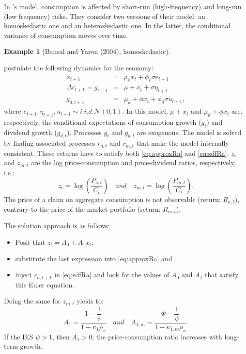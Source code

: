 \documentclass[
  12pt,
]{book}
\providecommand{\tightlist}{%
  \setlength{\itemsep}{0pt}\setlength{\parskip}{0pt}}
\theoremstyle{definition}
\theoremstyle{definition}
\newtheorem{example}{Example}[chapter]
\theoremstyle{definition}
\theoremstyle{definition}
\theoremstyle{remark}
\begin{document}
In \citet{Bansal_Yaron_2004}'s model, consumption is affected by short-run (high-frequency) and long-run (low frequency) risks. They consider two versions of their model: an homoskedastic one and an heteroskedastic one. In the latter, the conditional variance of consumption moves over time.

\begin{example}[Bansal and Yaron (2004), homoskedastic]
\protect\hypertarget{exm:BYHomsk}{}\label{exm:BYHomsk}

\citet{Bansal_Yaron_2004} postulate the following dynamics for the economy:
\begin{eqnarray*}
x_{t+1} &=& \rho_x x_t + \phi_e \sigma e_{t+1}\\
\Delta c_{t+1} = g_{t+1} &=& \mu + x_t + \sigma \eta_{t+1}\\
g_{d,t+1} &=& \mu_d + \phi x_t + \phi_d \sigma u_{t+1},
\end{eqnarray*}
where \(e_{t+1},\eta_{t+1},u_{t+1} \sim i.i.d. \mathcal{N}(0,1)\). In this model,
\(\mu + x_t\) and \(\mu_d + \phi x_t\) are, respectively, the conditional expectations of consumption growth (\(g_t\)) and dividend growth (\(g_{d,t}\)). Processes \(g_t\) and \(g_{d,t}\) are exogenous. The model is solved by finding associated processes \(r_{a,t}\) and \(r_{m,t}\) that make the model internally consistent. These returns have to satisfy both \eqref{eq:approxRa} and \eqref{eq:sdfRa}.
\(z_t\) and \(z_{m,t}\) are the log price-consumption and price-dividend ratios, respectively, i.e.:
\[
z_t = \log\left(\frac{P_{a,t}}{C_t}\right) \quad and \quad z_{m,t} = \log\left(\frac{P_{m,t}}{C_t}\right).
\]
The price of a claim on aggregate consumption is not observable (return: \(R_{a,t}\)), contrary to the price of the market portfolio (return: \(R_{m,t}\)).

The solution approach is as follows:

\begin{itemize}
\tightlist
\item
  Posit that \(z_t = A_0 + A_1 x_t\);
\item
  substitute the last expression into \eqref{eq:approxRa} and
\item
  inject \(r_{a,t+1}\) in \eqref{eq:sdfRa} and look for the values of \(A_0\) and \(A_1\) that satisfy this Euler equation.
\end{itemize}

Doing the same for \(z_{m,t}\) yields to:
\begin{equation}
A_1 = \frac{1- \dfrac{1}{\psi}}{1 - \kappa_1 \rho_x} \quad and \quad A_{1,m} = \frac{\Phi- \dfrac{1}{\psi}}{1 - \kappa_{1,m} \rho_x}.\label{eq:solABY1}
\end{equation}
If the IES \(\psi > 1\), then \(A_1 > 0\); the price-consumption ratio increases with long-term growth.


\end{example}
\end{document}
